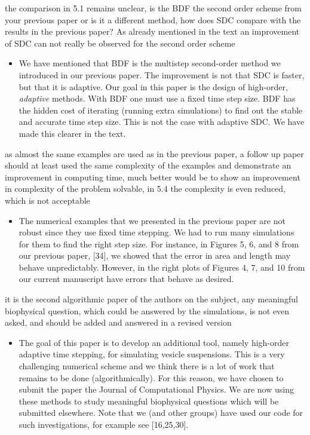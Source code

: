 \documentclass[12pt]{article}
\newcommand{\comment}[1]{{\color{blue} #1}}
\begin{document}
\comment{the comparison in 5.1 remains unclear, is the BDF the second
order scheme from your previous paper or is it a different method, how
does SDC compare with the results in the previous paper? As already
mentioned in the text an improvement of SDC can not really be observed
for the second order scheme}

\begin{itemize}
  \item We have mentioned that BDF is the multistep second-order method
  we introduced in our previous paper. The improvement is not that SDC
  is faster, but that it is adaptive.  Our goal in this paper is the
  design of high-order, {\em adaptive} methods.  With BDF one must use a
  fixed time step size.  BDF has the hidden cost of iterating (running
  extra simulations) to find out the stable and accurate time step size.
  This is not the case with adaptive SDC.  We have made this clearer in
  the text.
\end{itemize}

\comment{as almost the same examples are used as in the previous paper,
a follow up paper should at least used the same complexity of the
examples and demonstrate an improvement in computing time, much better
would be to show an improvement in complexity of the problem solvable,
in 5.4 the complexity is even reduced, which is not acceptable}

\begin{itemize}
  \item The numerical examples that we presented in the previous paper
  are not robust since they use fixed time stepping.  We had to run many
  simulations for them to find the right step size.  For instance, in
  Figures 5, 6, and 8 from our previous paper, [34], we showed that  the
  error in area and length may behave unpredictably.  However, in the
  right plots of Figures 4, 7, and 10 from our current manuscript have
  errors that behave as desired.
\end{itemize}

\comment{it is the second algorithmic paper of the authors on the
subject, any meaningful biophysical question, which could be answered by
the simulations, is not even asked, and should be added and answered in
a revised version}
\begin{itemize}
  \item The goal of this paper is to develop an additional tool, namely
  high-order adaptive time stepping, for simulating vesicle suspensions.
  This is a very challenging numerical scheme and we think there is a
  lot of work that remains to be done (algorithmically).  For this
  reason, we have chosen to submit the paper the Journal of
  Computational Physics.  We are now using these methods to study
  meaningful biophysical questions which will be submitted elsewhere.
  Note that we (and other groups) have used our code for such
  investigations, for example see [16,25,30].
\end{itemize}
\end{document}
